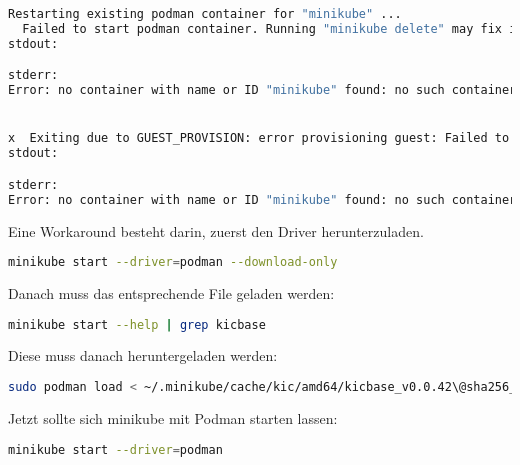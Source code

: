 \begin{lstlisting}[language=bash, caption=minikube start issue,captionpos=b,label={lst:minikube-start-issue},breaklines=true]
  Restarting existing podman container for "minikube" ...
  Failed to start podman container. Running "minikube delete" may fix it: driver start: start: sudo -n podman start --cgroup-manager cgroupfs minikube: exit status 125
stdout:

stderr:
Error: no container with name or ID "minikube" found: no such container


x  Exiting due to GUEST_PROVISION: error provisioning guest: Failed to start host: driver start: start: sudo -n podman start --cgroup-manager cgroupfs minikube: exit status 125
stdout:

stderr:
Error: no container with name or ID "minikube" found: no such container
\end{lstlisting}

Eine Workaround besteht darin, zuerst den Driver herunterzuladen.
\lstset{style=gra_codestyle}
\begin{lstlisting}[language=bash, caption=minikube / Podman driver download,captionpos=b,label={lst:minikube-podman-driver-download},breaklines=true]
minikube start --driver=podman --download-only
\end{lstlisting}

Danach muss das entsprechende File geladen werden:
\lstset{style=gra_codestyle}
\begin{lstlisting}[language=bash, caption=minikube / Podman kicbase prüfen,captionpos=b,label={lst:minikube-podman-get-kicbase},breaklines=true]
minikube start --help | grep kicbase
\end{lstlisting}

Diese muss danach heruntergeladen werden:
\lstset{style=gra_codestyle}
\begin{lstlisting}[language=bash, caption=minikube / Podman kicbase laden,captionpos=b,label={lst:minikube-podman-load-kicbase},breaklines=true]
sudo podman load < ~/.minikube/cache/kic/amd64/kicbase_v0.0.42\@sha256_d35ac07dfda971cabee05e0deca8aeac772f885a5348e1a0c0b0a36db20fcfc0.tar
\end{lstlisting}

Jetzt sollte sich minikube mit Podman starten lassen:
\lstset{style=gra_codestyle}
\begin{lstlisting}[language=bash, caption=minikube / Podman Starten,captionpos=b,label={lst:minikube-start-podman},breaklines=true]
minikube start --driver=podman
\end{lstlisting}

